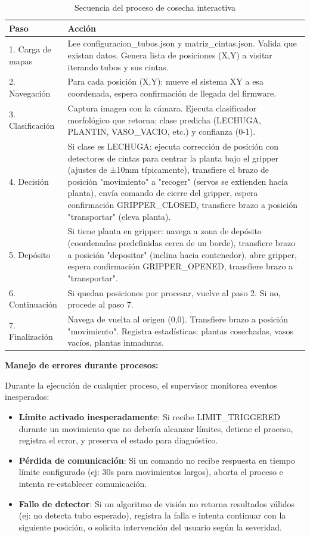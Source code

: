 \begin{table}[H]
\centering
\small
\begin{tabular}{|l|p{10cm}|}
\hline
\textbf{Paso} & \textbf{Acción} \\
\hline
1. Carga de mapas & Lee configuracion\_tubos.json y matriz\_cintas.json. Valida que existan datos. Genera lista de posiciones (X,Y) a visitar iterando tubos y sus cintas. \\
\hline
2. Navegación & Para cada posición (X,Y): mueve el sistema XY a esa coordenada, espera confirmación de llegada del firmware. \\
\hline
3. Clasificación & Captura imagen con la cámara. Ejecuta clasificador morfológico que retorna: clase predicha (LECHUGA, PLANTIN, VASO\_VACIO, etc.) y confianza (0-1). \\
\hline
4. Decisión & Si clase es LECHUGA: ejecuta corrección de posición con detectores de cintas para centrar la planta bajo el gripper (ajustes de ±10mm típicamente), transfiere el brazo de posición "movimiento" a "recoger" (servos se extienden hacia planta), envía comando de cierre del gripper, espera confirmación GRIPPER\_CLOSED, transfiere brazo a posición "transportar" (eleva planta). \\
\hline
5. Depósito & Si tiene planta en gripper: navega a zona de depósito (coordenadas predefinidas cerca de un borde), transfiere brazo a posición "depositar" (inclina hacia contenedor), abre gripper, espera confirmación GRIPPER\_OPENED, transfiere brazo a "transportar". \\
\hline
6. Continuación & Si quedan posiciones por procesar, vuelve al paso 2. Si no, procede al paso 7. \\
\hline
7. Finalización & Navega de vuelta al origen (0,0). Transfiere brazo a posición "movimiento". Registra estadísticas: plantas cosechadas, vasos vacíos, plantas inmaduras. \\
\hline
\end{tabular}
\caption{Secuencia del proceso de cosecha interactiva}
\label{tab:proceso_cosecha}
\end{table}

\textbf{Manejo de errores durante procesos:}

Durante la ejecución de cualquier proceso, el supervisor monitorea eventos inesperados:

\begin{itemize}
    \item \textbf{Límite activado inesperadamente}: Si recibe LIMIT\_TRIGGERED durante un movimiento que no debería alcanzar límites, detiene el proceso, registra el error, y preserva el estado para diagnóstico.
    \item \textbf{Pérdida de comunicación}: Si un comando no recibe respuesta en tiempo límite configurado (ej: 30s para movimientos largos), aborta el proceso e intenta re-establecer comunicación.
    \item \textbf{Fallo de detector}: Si un algoritmo de visión no retorna resultados válidos (ej: no detecta tubo esperado), registra la falla e intenta continuar con la siguiente posición, o solicita intervención del usuario según la severidad.
\end{itemize}


